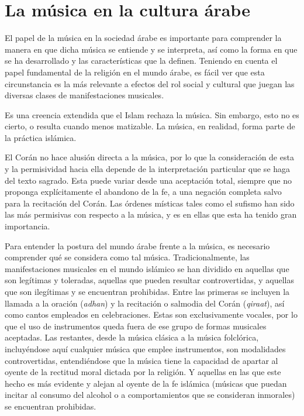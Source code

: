     \section{La música en la cultura árabe}

    El papel de la música en la sociedad árabe es importante para comprender la manera en que dicha música se entiende y se interpreta, así como la forma en que se ha desarrollado y las características que la definen. Teniendo en cuenta el papel fundamental de la religión en el mundo árabe, es fácil ver que esta circunstancia es la más relevante a efectos del rol social y cultural que juegan las diversas clases de manifestaciones musicales.

    Es una creencia extendida que el Islam rechaza la música. Sin embargo, esto no es cierto, o resulta cuando menos matizable. La música, en realidad, forma parte de la práctica islámica.

    El Corán no hace alusión directa a la música, por lo que la consideración de esta y la permisividad hacia ella depende de la interpretación particular que se haga del texto sagrado. Esta puede variar desde una aceptación total, siempre que no proponga explícitamente el abandono de la fe, a una negación completa salvo para la recitación del Corán. Las órdenes místicas tales como el sufismo han sido las más permisivas con respecto a la música, y es en ellas que esta ha tenido gran importancia.

    Para entender la postura del mundo árabe frente a la música, es necesario comprender qué se considera como tal música. Tradicionalmente, las manifestaciones musicales en el mundo islámico se han dividido en aquellas que son legítimas y toleradas, aquellas que pueden resultar controvertidas, y aquellas que son ilegítimas y se encuentran prohibidas. Entre las primeras se incluyen la llamada a la oración (\emph{adhan}) y la recitación o salmodia del Corán (\emph{qiraat}), así como cantos empleados en celebraciones. Estas son exclusivamente vocales, por lo que el uso de instrumentos queda fuera de ese grupo de formas musicales aceptadas. Las restantes, desde la música clásica a la música folclórica, incluyéndose aquí cualquier música que emplee instrumentos, son modalidades controvertidas, entendiéndose que la música tiene la capacidad de apartar al oyente de la rectitud moral dictada por la religión. Y aquellas en las que este hecho es más evidente y alejan al oyente de la fe islámica (músicas que puedan incitar al consumo del alcohol o a comportamientos que se consideran inmorales) se encuentran prohibidas.

